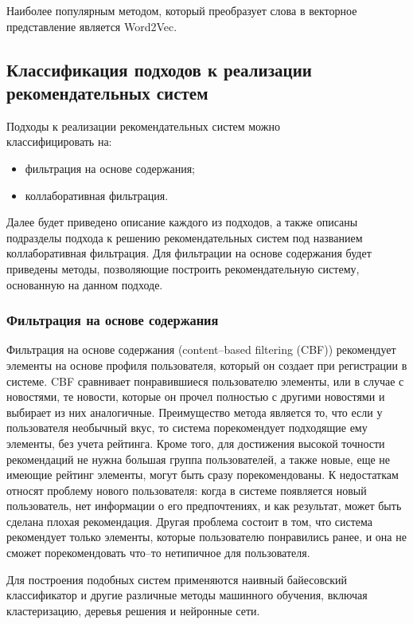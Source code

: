 Наиболее популярным методом, который преобразует слова в векторное представление является Word2Vec.

\subsection{Классификация подходов к реализации рекомендательных систем}
Подходы к реализации рекомендательных систем можно\\классифицировать на:

\begin{itemize}
	\item фильтрация на основе содержания;
	\item коллаборативная фильтрация.
\end{itemize}

Далее будет приведено описание каждого из подходов, а также описаны подразделы подхода к решению рекомендательных систем под названием коллаборативная фильтрация. Для фильтрации на основе содержания будет приведены методы, позволяющие построить рекомендательную систему, основанную на данном подходе.

\subsubsection{Фильтрация на основе содержания}
Фильтрация на основе содержания (content–based filtering (CBF)) рекомендует элементы на основе профиля пользователя, который он создает при регистрации в системе. CBF сравнивает понравившиеся пользователю элементы, или в случае с новостями, те новости, которые он прочел полностью с другими новостями и выбирает из них аналогичные. Преимущество метода является то, что если у пользователя необычный вкус, то система порекомендует подходящие ему элементы, без учета рейтинга. Кроме того, для достижения высокой точности рекомендаций не нужна большая группа пользователей, а также новые, еще не имеющие рейтинг элементы, могут быть сразу порекомендованы. К недостаткам относят проблему нового пользователя: когда в системе появляется новый пользователь, нет информации о его предпочтениях, и как результат, может быть сделана плохая рекомендация. Другая проблема состоит в том, что система рекомендует только элементы, которые пользователю понравились ранее, и она не сможет порекомендовать что–то нетипичное для пользователя.

Для построения подобных систем применяются наивный байесовский классификатор и другие различные методы машинного обучения, включая кластеризацию, деревья решения и нейронные сети.

